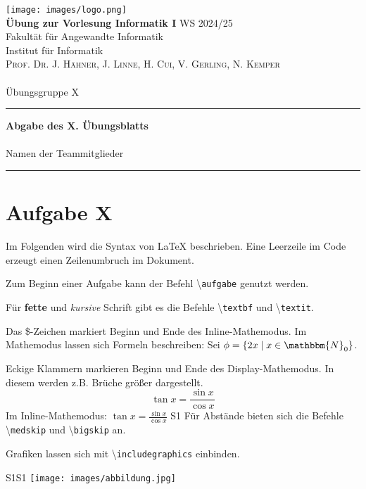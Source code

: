 \documentclass[paper=a4, %
         fontsize=10pt,  %
         oneside,        %
         headsepline,    %
         notitlepage     %
]{scrartcl}              %
\newcommand{\ownline}{\vspace{.7em}\hrule\vspace{.7em}}
\newcommand{\aufgabe}[1]{\section*{Aufgabe #1}}
\begin{document}
\texttt{[image: images/logo.png]} \\
\textbf{Übung zur Vorlesung Informatik I} \hfill{WS 2024/25} \\  
Fakultät für Angewandte Informatik \\
Institut für Informatik \\
\textsc{Prof. Dr. J. Hähner, J. Linne, H. Cui, V. Gerling, N. Kemper} \\
\mbox{} \\
{\large Übungsgruppe X} %
\ownline
\begin{center}
{\LARGE \textbf{Abgabe des X. Übungsblatts}} \\ %
\mbox{} \\
{\large Namen der Teammitglieder} \\ %
\end{center}
\ownline



\aufgabe{X}

Im Folgenden wird die Syntax von LaTeX beschrieben.
Eine Leerzeile im Code erzeugt einen Zeilenumbruch im Dokument.

Zum Beginn einer Aufgabe kann der Befehl \textbackslash\texttt{aufgabe} genutzt werden.

Für \textbf{fette} und \textit{kursive} Schrift gibt es die Befehle \textbackslash\texttt{textbf} und \textbackslash\texttt{textit}.

Das \$-Zeichen markiert Beginn und Ende des Inline-Mathemodus.
Im Mathemodus lassen sich Formeln beschreiben:
Sei $\phi = \{ 2x \mid x \in \mathbbm{N}_0 \}$.

Eckige Klammern markieren Beginn und Ende des Display-Mathemodus.
In diesem werden z.B. Brüche größer dargestellt.
\[ \tan x = \frac{\sin x}{ \cos x} \]
Im Inline-Mathemodus: $\tan x = \frac{\sin x}{ \cos x}$
S1
\bigskip
Für Abstände bieten sich die Befehle \textbackslash\texttt{medskip} und \textbackslash\texttt{bigskip} an.

\bigskip
Grafiken lassen sich mit \textbackslash\texttt{includegraphics} einbinden.

\begin{center}S1S1
\texttt{[image: images/abbildung.jpg]}
\end{center}
\end{document}
